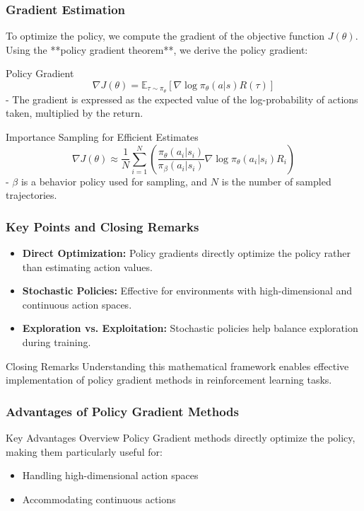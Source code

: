\documentclass{beamer}
\begin{document}
\begin{frame}[fragile]
    \frametitle{Gradient Estimation}
    
    To optimize the policy, we compute the gradient of the objective function \(J(\theta)\). Using the **policy gradient theorem**, we derive the policy gradient:

    \begin{block}{Policy Gradient}
        \[
        \nabla J(\theta) = \mathbb{E}_{\tau \sim \pi_{\theta}} \left[ \nabla \log \pi_{\theta}(a|s) R(\tau) \right]
        \]
        - The gradient is expressed as the expected value of the log-probability of actions taken, multiplied by the return.
    \end{block}

    \begin{block}{Importance Sampling for Efficient Estimates}
        \[
        \nabla J(\theta) \approx \frac{1}{N} \sum_{i=1}^{N} \left( \frac{\pi_{\theta}(a_i|s_i)}{\pi_{\beta}(a_i|s_i)} \nabla \log \pi_{\theta}(a_i|s_i) R_i \right)
        \]
        - \(\beta\) is a behavior policy used for sampling, and \(N\) is the number of sampled trajectories.
    \end{block}
\end{frame}

\begin{frame}[fragile]
    \frametitle{Key Points and Closing Remarks}

    \begin{itemize}
        \item \textbf{Direct Optimization:} Policy gradients directly optimize the policy rather than estimating action values.
        \item \textbf{Stochastic Policies:} Effective for environments with high-dimensional and continuous action spaces.
        \item \textbf{Exploration vs. Exploitation:} Stochastic policies help balance exploration during training.
    \end{itemize}

    \begin{block}{Closing Remarks}
        Understanding this mathematical framework enables effective implementation of policy gradient methods in reinforcement learning tasks.
    \end{block}
\end{frame}

\begin{frame}[fragile]
    \frametitle{Advantages of Policy Gradient Methods}
    
    \begin{block}{Key Advantages Overview}
        Policy Gradient methods directly optimize the policy, making them particularly useful for:
        \begin{itemize}
            \item Handling high-dimensional action spaces
            \item Accommodating continuous actions
        \end{itemize}
    \end{block}
\end{frame}
\end{document}
